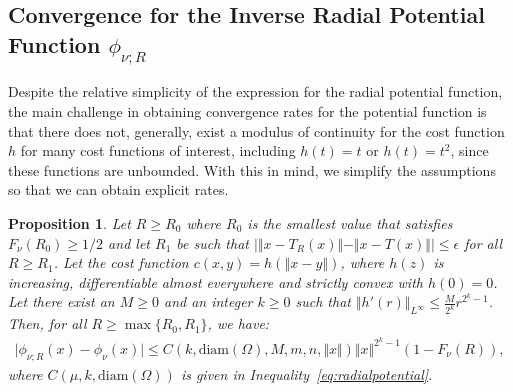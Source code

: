 \documentclass{amsart}
\theoremstyle{lemma}
\newtheorem{proposition}[theorem]{Proposition}
\theoremstyle{remark}
\begin{document}
\subsection{Convergence for the Inverse Radial Potential Function $\phi_{\nu; R}$}\label{sec:radialBrenier}

Despite the relative simplicity of the expression for the radial potential function, the main challenge in obtaining convergence rates for the potential function is that there does not, generally, exist a modulus of continuity for the cost function $h$ for many cost functions of interest, including $h(t) = t$ or $h(t) = t^2$, since these functions are unbounded. With this in mind, we simplify the assumptions so that we can obtain explicit rates.

\begin{proposition}
Let $R \geq R_0$ where $R_0$ is the smallest value that satisfies $F_{\nu}(R_0) \geq 1/2$ and let $R_1$ be such that $\vert \Vert x - T_{R}(x) \Vert - \Vert x - T(x) \Vert \vert \leq \epsilon$ for all $R \geq R_1$. Let the cost function $c(x,y) = h(\left\Vert x - y \right\Vert)$, where $h(z)$ is increasing, differentiable almost everywhere and strictly convex with $h(0) = 0$. Let there exist an $M \geq 0$ and an integer $k \geq 0$ such that $\Vert h'(r) \Vert_{L^{\infty}} \leq \frac{M}{2^{k}} r^{2^{k}-1}$. Then, for all $R \geq \max \{R_0, R_1\}$, we have:
\begin{align}
\vert \phi_{\nu;R}(x) - \phi_{\nu}(x) \vert \leq C(k, \text{diam}(\Omega), M, m, n, \Vert x \Vert) \Vert x \Vert^{2^{k}-1} (1-F_{\nu}(R)),
\end{align}
where $C(\mu, k, \text{diam}(\Omega))$ is given in Inequality~\eqref{eq:radialpotential}.
\end{proposition}
\end{document}
